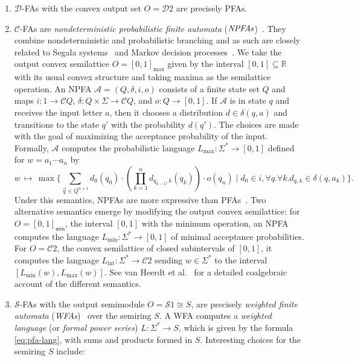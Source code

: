 \documentclass[a4paper, UKenglish, numberwithinsect, thm-restate, cleveref, final]{lipics-v2021}
\theoremstyle{plain}
\theoremstyle{definition}
\renewcommand{\S}{\mathcal{S}}
\newcommand{\C}{\ensuremath{\mathcal{C}}}
\newcommand{\D}{\ensuremath{\mathcal{D}}}
\newcommand{\R}{\ensuremath{\mathds{R}}}
\newcommand{\A}{\ensuremath{\mathcal{A}}\xspace}
\numberwithin{equation}{section}
\begin{document}
\begin{expl}\label{ex:t-fa}
  \begin{enumerate}[(1)]
    \item\label{ex:t-fa:pfa}
$\D$-FAs with the convex output set $O=\D 2$ are precisely PFAs.
    \item\label{ex:t-fa:npfa}
$\C$-FAs are \emph{nondeterministic probabilistic finite automata}
      ($\emph{NPFAs}$)~\cite{hhos18}. They combine nondeterministic and probabilistic branching
      and as such are closely related to Segala systems~\cite{segala95} and Markov decision
      processes~\cite[Ch.~36]{pin21_handbook}. We take the output convex semilattice
      $O=[0,1]_{\max}$ given by the interval $[0,1] \subseteq \R$
      with its usual convex structure and taking maxima as
      the semilattice operation. An NPFA $\A=(Q,\delta,i,o)$ consists of a finite
      state set $Q$ and maps
      $i\colon 1\to \C Q$, $\delta\colon Q\times \Sigma\to \C Q$, and $o\colon Q\to [0,1]$.
If $\A$ is in state $q$ and receives the input letter $a$, then it chooses a
      distribution $d\in \delta(q,a)$ and transitions to the state $q'$ with the probability
      $d(q')$. The choices are made with the goal of maximizing the acceptance probability of
      the input. Formally, $\A$ computes the probabilistic language
      $L_{\max}\colon \Sigma^*\to [0,1]$ defined for $w=a_1\cdots a_n$ by
          \[w\,\mapsto\,\textstyle
          \max \{ \sum_{\vec{q}\in Q^{n+1}} \!d_{0}(q_{0}) \cdot (\prod_{k=1}^{n}d_{q_{k-1},k}(q_{k})) \cdot o(q_{n}) \mid d_{0} \in i, \forall q. \forall k. d_{q,k}\in \delta(q,a_k) \}.
          \]
          Under this semantics, NPFAs are more expressive than PFAs~\cite{hhos18}. Two alternative semantics emerge by modifying the output convex semilattice: for $O=[0,1]_{\mathsf{min}}$, the interval $[0,1]$ with the minimum operation, an NPFA computes the language $L_{\min}\colon \Sigma^*\to [0,1]$ of minimal acceptance probabilities. For $O=\C 2$, the convex semilattice of closed subintervals of $[0,1]$, it computes the language $L_{\mathrm{int}}\colon \Sigma^*\to \C 2$ sending $w\in \Sigma^*$ to the interval $[L_{\min}(w), L_{\max}(w)]$. See van Heerdt et al.~\cite{hhos18} for a detailed coalgebraic account of the different semantics.
    \item\label{ex:t-fa:wfa}
$\S$-FAs with the output semimodule
          $O=\S 1 \cong S$, are precisely \emph{weighted finite automata} ($\!$\emph{WFAs})~\cite{dkv09} over the semiring $S$. A WFA computes a \emph{weighted language} (or \emph{formal power series}) \mbox{$L\colon \Sigma^*\to S$}, which is given by the formula \eqref{eq:pfa-lang}, with sums and products formed in $S$. Interesting  choices for the semiring \(S\) include:

\end{enumerate}
\end{expl}
\end{document}
